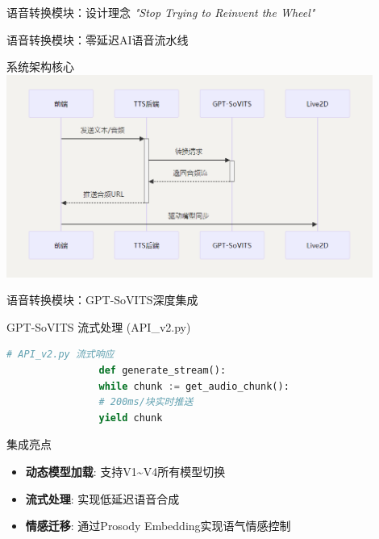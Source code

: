 \documentclass{beamer}
\begin{document}
	\begin{frame}{语音转换模块：设计理念}
		\centering
		\textit{"Stop Trying to Reinvent the Wheel"}
	\end{frame}
	\begin{frame}{语音转换模块：零延迟AI语音流水线}
		\begin{block}{系统架构核心}
			\centering
			\includegraphics[width=0.9\textwidth]{pic/voice_seq.png}
		\end{block}
	\end{frame}
	\begin{frame}[fragile]{语音转换模块：GPT-SoVITS深度集成}
		\begin{block}{GPT-SoVITS 流式处理 (API\_v2.py)}
			\begin{lstlisting}[language=Python]
				# API_v2.py 流式响应
				def generate_stream():
				while chunk := get_audio_chunk():
				# 200ms/块实时推送
				yield chunk  
			\end{lstlisting}
		\end{block}
		\begin{exampleblock}{集成亮点}
			\begin{itemize}
				\item \textbf{动态模型加载}: 支持V1\textasciitilde V4所有模型切换
				\item \textbf{流式处理}: 实现低延迟语音合成
				\item \textbf{情感迁移}: 通过Prosody Embedding实现语气情感控制
			\end{itemize}
		\end{exampleblock}
	\end{frame}
	
\end{document}
